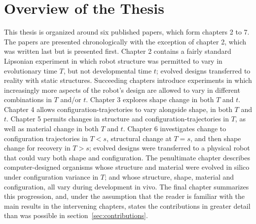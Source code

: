 \section{Overview of the Thesis}
This thesis is organized around six published papers, which form chapters 2 to 7.
The papers are presented chronologically with the exception of chapter 2, which was written last but is presented first.
Chapter 2 contains a fairly standard Lipsonian experiment in which robot structure was permitted to vary in evolutionary time $T$, but not developmental time $t$; evolved designs transferred to reality with static structures.
Succeeding chapters introduce experiments in which increasingly more aspects of the robot's design are allowed to vary in different combinations in $T$ and/or $t$.
Chapter 3 explores shape change in both $T$ and $t$.
Chapter 4 allows configuration-trajectories to vary alongside shape, in both $T$ and $t$.
Chapter 5 permits changes in structure and configuration-trajectories in $T$, as well as material change in both $T$ and $t$.
Chapter 6 investigates change to configuration trajectories in $T<s$, structural change at $T=s$, and then shape change for recovery in $T>s$; evolved designs were transferred to a physical robot that could vary both shape and configuration.
The penultimate chapter describes 
computer-designed
organisms whose structure and material were evolved in silico under configuration variance in $T$; and whose structure, shape, material and configuration, all vary during development in vivo.
The final chapter summarizes this progression,
and, under the assumption that the reader is familiar with the main results in the intervening chapters, states the contributions in greater detail than was possible in section~\ref{sec:contributions}.


